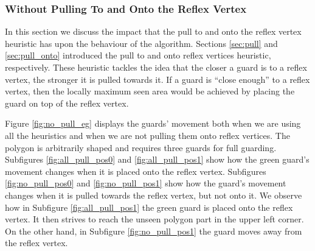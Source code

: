 \subsubsection{Without Pulling To and Onto the Reflex Vertex}
In this section we discuss the impact that the pull to and onto the reflex vertex heuristic has upon the behaviour of the algorithm. Sections \ref{sec:pull} and \ref{sec:pull_onto} introduced the pull to and onto reflex vertices heuristic, respectively. These heuristic tackles the idea that the closer a guard is to a reflex vertex, the stronger it is pulled towards it. If a guard is ``close enough'' to a reflex vertex, then the locally maximum seen area would be achieved by placing the guard on top of the reflex vertex. 

Figure \ref{fig:no_pull_eg} displays the guards' movement both when we are using all the heuristics and when we are not pulling them onto reflex vertices. The polygon is arbitrarily shaped and requires three guards for full guarding. Subfigures \ref{fig:all_pull_pos0} and \ref{fig:all_pull_pos1} show how the green guard's movement changes when it is placed onto the reflex vertex. Subfigures \ref{fig:no_pull_pos0} and \ref{fig:no_pull_pos1} show how the guard's movement changes when it is pulled towards the reflex vertex, but not onto it. We  observe how in Subfigure \ref{fig:all_pull_pos1} the green guard is placed onto the reflex vertex. It then strives to reach the unseen polygon part in the upper left corner. On the other hand, in Subfigure \ref{fig:no_pull_pos1} the guard moves away from the reflex vertex.

